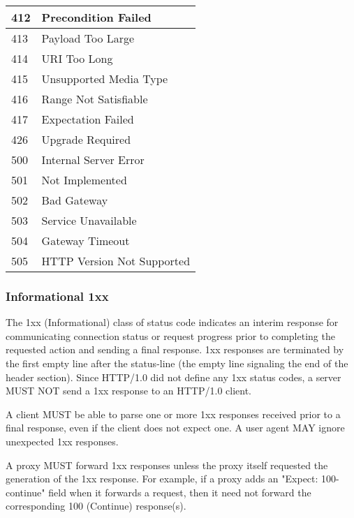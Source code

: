 \begin{longtable}{|l|l|}
   \\ \hline 412  & Precondition Failed           
   \\ \hline 413  & Payload Too Large             
   \\ \hline 414  & URI Too Long                  
   \\ \hline 415  & Unsupported Media Type        
   \\ \hline 416  & Range Not Satisfiable         
   \\ \hline 417  & Expectation Failed            
   \\ \hline 426  & Upgrade Required              
   \\ \hline 500  & Internal Server Error         
   \\ \hline 501  & Not Implemented               
   \\ \hline 502  & Bad Gateway                   
   \\ \hline 503  & Service Unavailable           
   \\ \hline 504  & Gateway Timeout               
   \\ \hline 505  & HTTP Version Not Supported    
   \\ \hline
\end{longtable}

   
   
   \subsubsection{Informational 1xx}

   The 1xx (Informational) class of status code indicates an interim
   response for communicating connection status or request progress
   prior to completing the requested action and sending a final
   response. 1xx responses are terminated by the first empty line after
   the status-line (the empty line signaling the end of the header
   section).  Since HTTP/1.0 did not define any 1xx status codes, a
   server MUST NOT send a 1xx response to an HTTP/1.0 client.

   A client MUST be able to parse one or more 1xx responses received
   prior to a final response, even if the client does not expect one.  A
   user agent MAY ignore unexpected 1xx responses.

   A proxy MUST forward 1xx responses unless the proxy itself requested
   the generation of the 1xx response.  For example, if a proxy adds an
   "Expect: 100-continue" field when it forwards a request, then it need
   not forward the corresponding 100 (Continue) response(s).


